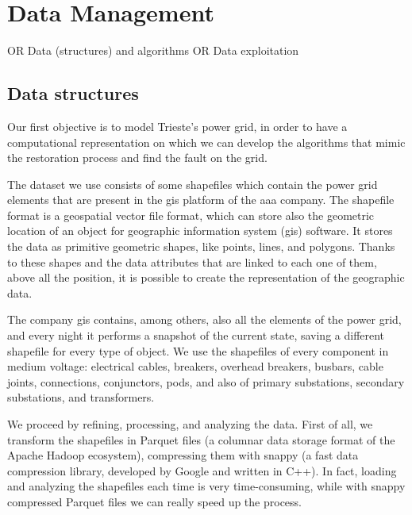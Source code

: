 \chapter{Data Management}
OR Data (structures) and algorithms OR Data exploitation


\section{Data structures}

Our first objective is to model Trieste's power grid, in order to have a computational representation on which we can develop the algorithms that mimic the restoration process and find the fault on the grid.

The dataset we use consists of some shapefiles which contain the power grid elements that are present in the \acrshort{gis} platform of the \acrshort{aaa} company. The shapefile format is a geospatial vector file format, which can store also the geometric location of an object for geographic information system (\acrshort{gis}) software. It stores the data as primitive geometric shapes, like points, lines, and polygons. Thanks to these shapes and the data attributes that are linked to each one of them, above all the position, it is possible to create the representation of the geographic data.

The company \acrshort{gis} contains, among others, also all the elements of the power grid, and every night it performs a snapshot of the current state, saving a different shapefile for every type of object. We use the shapefiles of every component in medium voltage: electrical cables, breakers, overhead breakers, busbars, cable joints, connections, conjunctors, pods, and also of primary substations, secondary substations, and transformers.



We proceed by refining, processing, and analyzing the data. First of all, we transform the shapefiles in Parquet files (a columnar data storage format of the Apache Hadoop ecosystem), compressing them with snappy (a fast data compression library, developed by Google and written in C++). In fact, loading and analyzing the shapefiles each time is very time-consuming, while with snappy compressed Parquet files we can really speed up the process.

